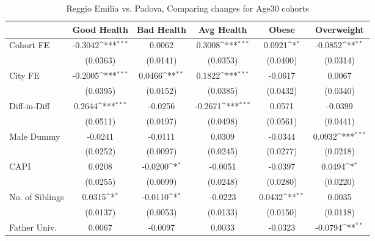 \begin{table}[htbp]\centering
\def\sym#1{\ifmmode^{#1}\else\(^{#1}\)\fi}
\caption{Reggio Emilia vs. Padova, Comparing changes for Age30 cohorts}
\begin{tabular}{l*{5}{c}}
\toprule
            &\multicolumn{1}{c}{Good Health}&\multicolumn{1}{c}{Bad Health}&\multicolumn{1}{c}{Avg Health}&\multicolumn{1}{c}{Obese}&\multicolumn{1}{c}{Overweight}\\
\midrule
Cohort FE   &     -0.3042\sym{***}&      0.0062         &      0.3008\sym{***}&      0.0921\sym{*}  &     -0.0852\sym{**} \\
            &    (0.0363)         &    (0.0141)         &    (0.0353)         &    (0.0400)         &    (0.0314)         \\
\addlinespace
City FE     &     -0.2005\sym{***}&      0.0466\sym{**} &      0.1822\sym{***}&     -0.0617         &      0.0067         \\
            &    (0.0395)         &    (0.0152)         &    (0.0385)         &    (0.0432)         &    (0.0340)         \\
\addlinespace
Diff-in-Diff&      0.2644\sym{***}&     -0.0256         &     -0.2671\sym{***}&      0.0571         &     -0.0399         \\
            &    (0.0511)         &    (0.0197)         &    (0.0498)         &    (0.0561)         &    (0.0441)         \\
\addlinespace
Male Dummy  &     -0.0241         &     -0.0111         &      0.0309         &     -0.0344         &      0.0932\sym{***}\\
            &    (0.0252)         &    (0.0097)         &    (0.0245)         &    (0.0277)         &    (0.0218)         \\
\addlinespace
CAPI        &      0.0208         &     -0.0200\sym{*}  &     -0.0051         &     -0.0397         &      0.0494\sym{*}  \\
            &    (0.0255)         &    (0.0099)         &    (0.0248)         &    (0.0280)         &    (0.0220)         \\
\addlinespace
No. of Siblings&      0.0315\sym{*}  &     -0.0110\sym{*}  &     -0.0223         &      0.0432\sym{**} &      0.0035         \\
            &    (0.0137)         &    (0.0053)         &    (0.0133)         &    (0.0150)         &    (0.0118)         \\
\addlinespace
Father Univ.&      0.0067         &     -0.0097         &      0.0033         &     -0.0323         &     -0.0794\sym{**} \\

\end{tabular}
\end{table}
